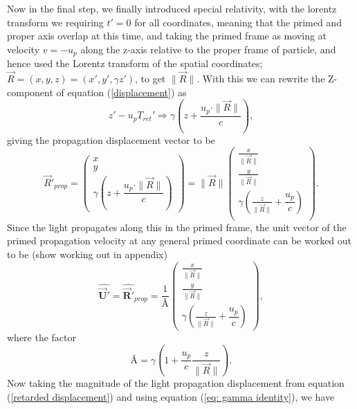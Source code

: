 Now in the final step, we finally introduced special relativity, with the lorentz transform we requiring $t'= 0$ for all coordinates, meaning that the primed and proper axis overlap at this time, and taking the primed frame as moving at velocity $v=-u_p$ along the z-axis relative to the proper frame of particle, and hence used the Lorentz transform of the spatial coordinates; $\vec{R}=(x,y,z)=(x',y',\gamma z')$, to get $\|\vec{R}\|$. With this we can rewrite the Z-component of equation (\eqref{displacement}) as
\begin{equation}%
    z' - u_p T_{ret}' \Rightarrow \gamma\left(z + \frac{u_p\cdot \|\vec{R}\|}{c}\right),
\end{equation}%
giving the propagation displacement vector to be
\begin{equation}%
\label{retarded displacement}
    \Vec{R}'_{prop}= \begin{pmatrix}
    x\\ y \\ \gamma \left(z + \dfrac{u_p \cdot \|\vec{R}\|}{c}\right)
    \end{pmatrix} = \|\vec{R}\|\begin{pmatrix}
    \frac{x}{\|\vec{R}\|}\\ \frac{y}{\|\vec{R}\|} \\ \gamma \left( \frac{z}{\|\vec{R}\|} + \dfrac{u_p}{c} \right)\\
    \end{pmatrix}.
\end{equation}%
Since the light propagates along this in the primed frame, the unit vector of the primed propagation velocity at any general primed coordinate can be worked out to be (show working out in appendix)
\begin{equation}%
\label{eq: unit retarded velocity}
    \hat{\mathbf{\vec{U}'}} = \hat{\mathbf{\vec{R}'}}_{prop} = \dfrac{1}{\text{\AA}} \begin{pmatrix}
    \frac{x}{\|\vec{R}\|}\\ \frac{y}{\|\vec{R}\|} \\ \gamma \left( \frac{z}{\|\vec{R}\|} + \dfrac{u_p}{c} \right)
    \end{pmatrix},
\end{equation}%
where the factor
\begin{equation}%
    \text{\AA} = \gamma\left( 1 + \frac{u_p}{c}\frac{z}{\|\vec{R}\|} \right).
\end{equation}%
Now taking the magnitude of the light propagation displacement from equation (\eqref{retarded displacement}) and using equation (\eqref{eq: gamma identity}), we have

